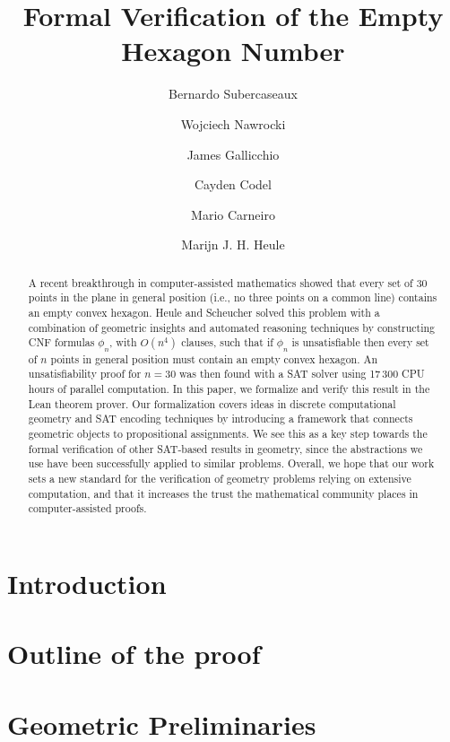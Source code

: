 \documentclass[a4paper, USenglish, cleveref, autoref, thm-restate]{lipics-v2021}
\title{\texorpdfstring{Formal Verification of the Empty Hexagon Number}{A Formal Verification of the Empty Hexagon Number}}%
\author{Bernardo {Subercaseaux}}{Carnegie Mellon University}{bsuberca@andrew.cmu.edu}{https://orcid.org/0000-0003-2295-1299}{}
\author{Wojciech {Nawrocki}}{Carnegie Mellon University}{wjnawrocki@cmu.edu}{https://orcid.org/0000-0002-8839-0618}{}
\author{James {Gallicchio}}{Carnegie Mellon University}{jgallicc@andrew.cmu.edu}{https://orcid.org/0000-0002-0838-3240}{}
\author{Cayden {Codel}}{Carnegie Mellon University}{ccodel@andrew.cmu.edu}{https://orcid.org/0000-0003-3588-4873}{}
\author{Mario {Carneiro}}{Carnegie Mellon University}{mcarneir@andrew.cmu.edu}{https://orcid.org/0000-0002-0470-5249}{}
\author{Marijn J. H. {Heule}}{Carnegie Mellon University}{mheule@andrew.cmu.edu}{https://orcid.org/0000-0002-5587-8801}{}
\begin{document}
\maketitle

\begin{abstract}
  A recent breakthrough in computer-assisted mathematics showed that every set of $30$ points in the plane in general position (i.e., no three points on a common line) contains an empty convex hexagon. %
  Heule and Scheucher solved this problem with a combination of geometric insights and automated reasoning techniques
  by constructing CNF formulas $\phi_n$, with $O(n^4)$ clauses,
  such that if $\phi_n$ is unsatisfiable then every set of $n$ points in general position must contain an empty convex hexagon.
  An unsatisfiability proof for $n = 30$ was then found with a SAT solver using 17\,300 CPU hours of parallel computation. %
  In this paper, we formalize and verify this result in the Lean theorem prover. Our formalization covers ideas in discrete computational geometry and SAT encoding techniques by introducing a framework that connects geometric objects to propositional assignments.
  We see this as a key step towards the formal verification of other SAT-based results in geometry, since the abstractions we use have been successfully applied to similar problems.
  Overall, we hope that our work sets a new standard for the verification of geometry problems relying on extensive computation,
  and that it increases the trust the mathematical community places in computer-assisted proofs.
\end{abstract}


\section{Introduction}\label{sec:intro}


\section{Outline of the proof}\label{sec:outline}


\section{Geometric Preliminaries}\label{sec:geometry}

\end{document}
